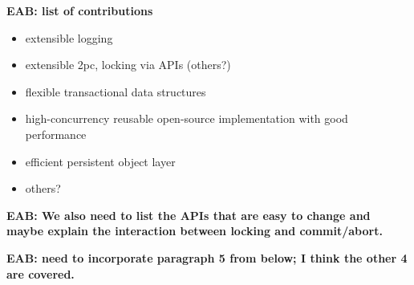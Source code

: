 \documentclass[letterpaper,twocolumn,english]{article}
\newcommand{\eab}[1]{{\bf EAB: #1}}
\begin{document}
\eab{list of contributions}
\begin{itemize}
\item extensible logging
\item extensible 2pc, locking via APIs (others?)
\item flexible transactional data structures
\item high-concurrency reusable open-source implementation with good
      performance
\item efficient persistent object layer
\item others?
\end{itemize}

\eab{We also need to list the APIs that are easy to change and maybe explain the interaction between locking and commit/abort.}

\eab{need to incorporate paragraph 5 from below; I think the other 4 are covered.}
\end{document}
